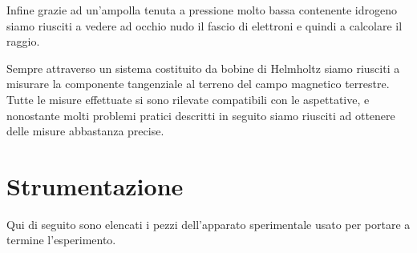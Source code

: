 \documentclass[a4paper,11pt]{article}
\begin{document}
	Infine grazie ad un'ampolla tenuta a pressione molto bassa contenente idrogeno siamo riusciti a vedere ad occhio nudo il fascio di elettroni e quindi a calcolare il raggio. 
	
	Sempre attraverso un sistema costituito da bobine di Helmholtz siamo riusciti a misurare la componente tangenziale al terreno del campo magnetico terrestre. Tutte le misure effettuate si sono rilevate compatibili con le aspettative, e nonostante molti problemi pratici descritti in seguito siamo riusciti ad ottenere delle misure abbastanza precise.
	
		\section{Strumentazione}
		
		Qui di seguito sono elencati i pezzi dell'apparato sperimentale usato per portare a termine l'esperimento.
\end{document}

